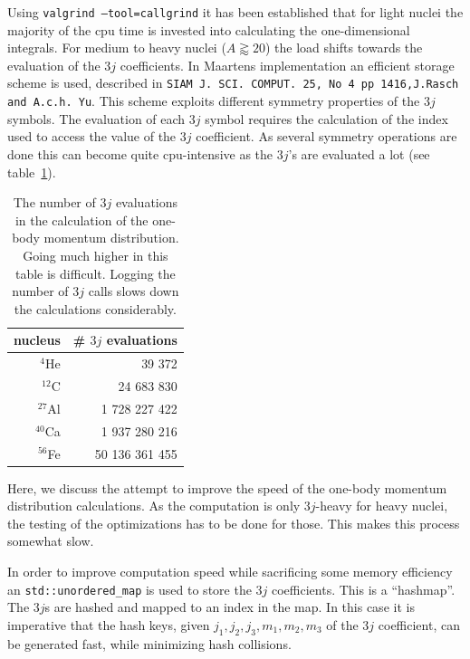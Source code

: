 \documentclass[10pt]{article}
\begin{document}
Using \texttt{valgrind --tool=callgrind} it has been established that for light nuclei the majority of the cpu time is invested into calculating the one-dimensional integrals. For medium to heavy nuclei ($ A \gtrapprox 20$) the load shifts towards the evaluation of the $3j$ coefficients. In Maartens implementation an efficient storage scheme is used, described in \texttt{SIAM J. SCI. COMPUT. 25, No 4 pp 1416,J.Rasch and A.c.h. Yu}.
This scheme exploits different symmetry properties of the $3j$ symbols.
The evaluation of each $3j$ symbol requires the calculation of the index used to access the value of the $3j$ coefficient.
As several symmetry operations are done this can become quite cpu-intensive as the $3j$'s are evaluated a lot (see table~\ref{tab:ob_num_3j_evals}).

\begin{table}
\centering
\begin{tabular}{r | r}
nucleus & \# $3j$ evaluations \\ \hline
$^{4}$He  &         39 372 \\
$^{12}$C  &     24 683 830 \\
$^{27}$Al &  1 728 227 422 \\
$^{40}$Ca &  1 937 280 216 \\
$^{56}$Fe & 50 136 361 455
\end{tabular}
\caption{The number of $3j$ evaluations in the calculation of the one-body momentum distribution.
Going much higher in this table is difficult. Logging the number of $3j$ calls slows down the calculations considerably.
}
\label{tab:ob_num_3j_evals}
\end{table}

Here, we discuss the attempt to improve the speed of the one-body momentum distribution calculations.
As the computation is only $3j$-heavy for heavy nuclei, the testing of the optimizations has to be done for those. This makes this process somewhat slow.

In order to improve computation speed while sacrificing some memory efficiency an \texttt{std::unordered\_map} is used to store the $3j$ coefficients. This is a ``hashmap''. The $3j$s are hashed and mapped to an index in the map.
In this case it is imperative that the hash keys, given $j_1,j_2,j_3,m_1,m_2,m_3$ of the $3j$ coefficient, can be generated fast, while minimizing hash collisions.
\end{document}
